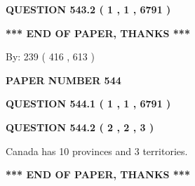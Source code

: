 \documentclass[12pt]{article}
\begin{document}
{\textbf{\Large{QUESTION
543.2 
 ( 1 , 1 , 6791 )
}}}
  
  
   
   
 \vspace{0.2in}
 
   
   
   
   
\vspace{1.0in} 
{\textbf{\large{ *** END OF PAPER, THANKS *** }}} 
   
   
\hspace{1.0in} By: 
 239 ( 416 ,  613 )
   
   
   
   
\newpage 
\setcounter{page}{ 
   544001 } 
   
   
   
   
 {\textbf{ \Large{ PAPER NUMBER  544  }}}
   
   
\vspace{0.2in}
   
   
   
   
   
   
 \vspace{0.2in}
 
 
 
 
   
   
  
\vspace{0.2in}
  
{\textbf{\Large{QUESTION
544.1 
 ( 1 , 1 , 6791 )
}}}
  
  
  
\vspace{0.2in}
  
{\textbf{\Large{QUESTION
544.2 
 ( 2 , 2 , 3 )
}}}
  
  
 
 
\noindent{}
 
 
Canada has 10  provinces and 3 territories.
 
 
 
 
   
   
 \vspace{0.2in}
 
   
   
   
   
\vspace{1.0in} 
{\textbf{\large{ *** END OF PAPER, THANKS *** }}} 
   
\end{document}
